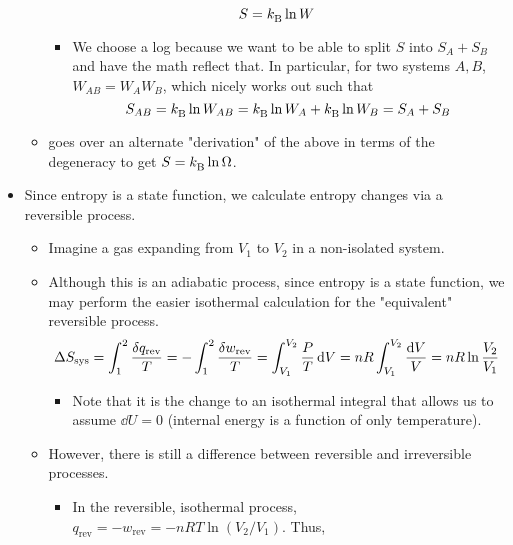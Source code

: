\documentclass[../notes.tex]{subfiles}
\begin{document}
\begin{itemize}
\begin{itemize}
\begin{equation*}
            S = {k_\text{B}^{}}\ln W
        \end{equation*}
        \begin{itemize}
            \item We choose a log because we want to be able to split $S$ into $S_A+S_B$ and have the math reflect that. In particular, for two systems $A,B$, $W_{AB}=W_AW_B$, which nicely works out such that
            \begin{equation*}
                S_{AB} = {k_\text{B}^{}}\ln W_{AB} = {k_\text{B}^{}}\ln W_A+{k_\text{B}^{}}\ln W_B = S_A+S_B
            \end{equation*}
        \end{itemize}
        \item \textcite{bib:McQuarrieSimon} goes over an alternate "derivation" of the above in terms of the degeneracy to get $S={k_\text{B}^{}}\ln\Omega$.
    \end{itemize}
    \item {}Since entropy is a state function, we calculate entropy changes via a reversible process.
    \begin{itemize}
        \item Imagine a gas expanding from $V_1$ to $V_2$ in a non-isolated system.
        \item Although this is an adiabatic process, since entropy is a state function, we may perform the easier isothermal calculation for the "equivalent" reversible process.
        \begin{equation*}
            \Delta S_\text{sys} = \int_1^2\frac{\var{q_\text{rev}}}{T}
            = -\int_1^2\frac{\var{w_\text{rev}}}{T}
            = \int_{V_1}^{V_2}\frac{P}{T}\dd{V}
            = nR\int_{V_1}^{V_2}\frac{\dd{V}}{V}
            = nR\ln\frac{V_2}{V_1}
        \end{equation*}
        \begin{itemize}
            \item Note that it is the change to an isothermal integral that allows us to assume $\dd{U}=0$ (internal energy is a function of only temperature).
        \end{itemize}
        \item However, there is still a difference between reversible and irreversible processes.
        \begin{itemize}
            \item In the reversible, isothermal process, $q_\text{rev}=-w_\text{rev}=-nRT\ln(V_2/V_1)$. Thus,
            \begin{equation*}

\end{equation*}
\end{itemize}
\end{itemize}
\end{itemize}
\end{document}

